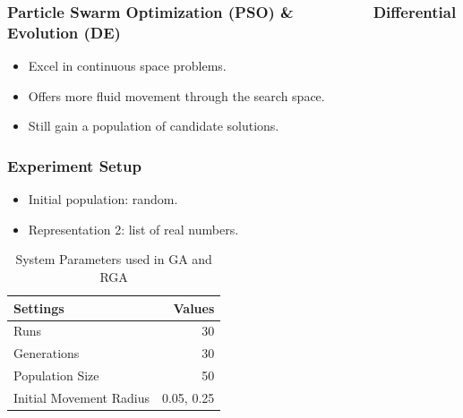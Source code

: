 \documentclass[10pt]{beamer}
\begin{document}
\begin{frame}
	\frametitle{Particle Swarm Optimization (PSO) \& \,\,\,\,\,\,\,\,\,\,\,\,\,\,\,\,\,\,\,\,\,\,\,\,\,\,\,\, Differential Evolution (DE)}

	\begin{itemize}
		\item Excel in continuous space problems.
		\item Offers more fluid movement through the search space.
		\item Still gain a population of candidate solutions.
	\end{itemize}
\end{frame}

\begin{frame}
	\frametitle{Experiment Setup}

	\begin{itemize}
		\item Initial population: random.
		\item Representation 2: list of real numbers.
	\end{itemize}

	\begin{table}
		\caption{System Parameters used in GA and RGA}
		\begin{tabular}{ | l | r | }
		  \hline
		    Settings & Values \\ \hline \hline
		    Runs & 30 \\ \hline
		    Generations & 30 \\ \hline
		    Population Size & 50 \\ \hline
		    Initial Movement Radius & 0.05, 0.25 \\ \hline
		\end{tabular}
	\end{table}

\end{frame}
\end{document}
